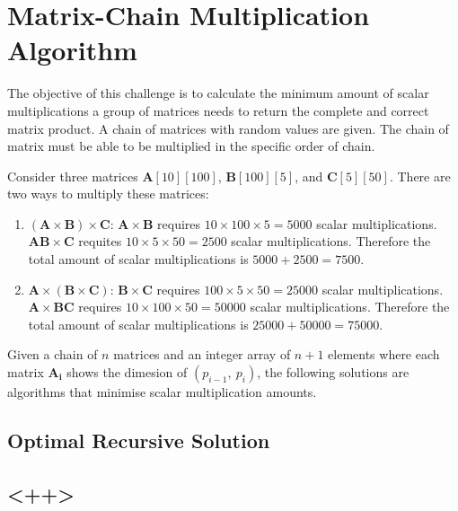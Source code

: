 \chapter{Matrix-Chain Multiplication Algorithm}
The objective of this challenge is to calculate the minimum amount of scalar
multiplications a group of matrices needs to return the complete and correct
matrix product. A chain of matrices with random values are given. The chain of
matrix must be able to be multiplied in the specific order of chain.

Consider three matrices $\mathbf{A}[10][100]$, $\mathbf{B}[100][5]$, and
$\mathbf{C}[5][50]$. There are two ways to multiply these matrices:
\begin{enumerate}
\item $(\mathbf{A}\times\mathbf{B})\times\mathbf{C}$: $\mathbf{A}\times
    \mathbf{B}$ requires $10\times100\times5=5000$ scalar multiplications.
    $\mathbf{AB}\times\mathbf{C}$ requites $10\times5\times50=2500$ scalar
    multiplications. Therefore the total amount of scalar multiplications is
    $5000+2500=7500$.
\item $\mathbf{A}\times(\mathbf{B}\times\mathbf{C})$: $\mathbf{B}\times
    \mathbf{C}$ requires $100\times5\times50=25000$ scalar multiplications.
    $\mathbf{A}\times\mathbf{BC}$ requires $10\times100\times50=50000$ scalar
    multiplications. Therefore the total amount of scalar multiplications is
    $25000+50000=75000$.
\end{enumerate}

Given a chain of $n$ matrices and an integer array of $n+1$ elements where each
matrix $\mathbf{A_i}$ shows the dimesion of $\left(p_{i-1},~p_i\right)$, the
following solutions are algorithms that minimise scalar multiplication amounts.

\section{Optimal Recursive Solution}


\section{<++>}
